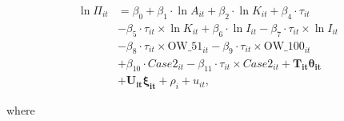 \documentclass[10pt,twocolumn,oneside,cmyk]{article}
\begin{document}
\begin{equation}\label{eqthirteen}
 \begin{split}
  \ln \Pi_{it} & = \beta_0 + \beta_1 \cdot \ln A_{it} + \beta_2 \cdot \ln K_{it} + \beta_4 \cdot \tau_{it} \\
	& - \beta_5 \cdot \tau_{it} \times \ln K_{it} + \beta_6 \cdot \ln I_{it} -\beta_7 \cdot \tau_{it} \times \ln I_{it}\\
	& - \beta_8 \cdot \tau_{it} \times \text{OW\_51}_{it}- \beta_9 \cdot \tau_{it} \times \text{OW\_100}_{it}\\
	& + \beta_{10} \cdot Case2_{it} - \beta_{11} \cdot \tau_{it} \times Case2_{it}+ \bm{T_{it} \theta_{it}}\\
	& +\bm{U_{it}\xi_{it}} + \rho_i+ u_{it},
 \end{split}
\end{equation}

where
\vspace{0.5cm}
\end{document}
